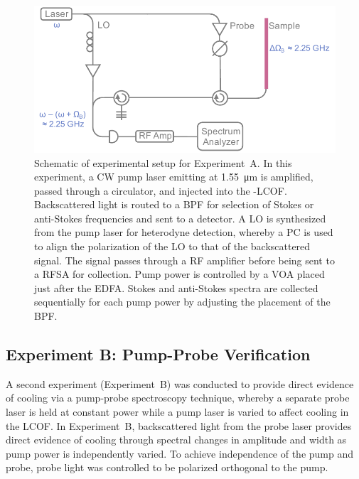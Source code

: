 \begin{figure}[t]
  \centering
  \includegraphics[width=\textwidth]{figs/3-Cooling/pumpOnlyDesign.pdf}
  \caption{Schematic of experimental setup for Experiment~A. In this experiment, a \ac{CW} pump laser emitting at \SI{1.55}{\micro\meter} is amplified, passed through a circulator, and injected into the -\ac{LCOF}. Backscattered light is routed to a \ac{BPF} for selection of Stokes or anti-Stokes frequencies and sent to a detector. A \ac{LO} is synthesized from the pump laser for heterodyne detection, whereby a \acl{PC} is used to align the polarization of the \ac{LO} to that of the backscattered signal. The signal passes through a \acl{RF} amplifier before being sent to a \ac{RFSA} for collection. Pump power is controlled by a \ac{VOA} placed just after the \ac{EDFA}. Stokes and anti-Stokes spectra are collected sequentially for each pump power by adjusting the placement of the \ac{BPF}.}
  \label{fig:Cooling:ExperimentADesign}
\end{figure}

\subsection{Experiment B: Pump-Probe Verification}
\label{Cooling:subsec:ExperimentBPump-ProbeVerification}

A second experiment (Experiment~B) was conducted to provide direct evidence of cooling via a pump-probe spectroscopy technique, whereby a separate probe laser is held at constant power while a pump laser is varied to affect cooling in the \ac{LCOF}. In Experiment~B, backscattered light from the probe laser provides direct evidence of cooling through spectral changes in amplitude and width as pump power is independently varied. To achieve independence of the pump and probe, probe light was controlled to be polarized orthogonal to the pump.

